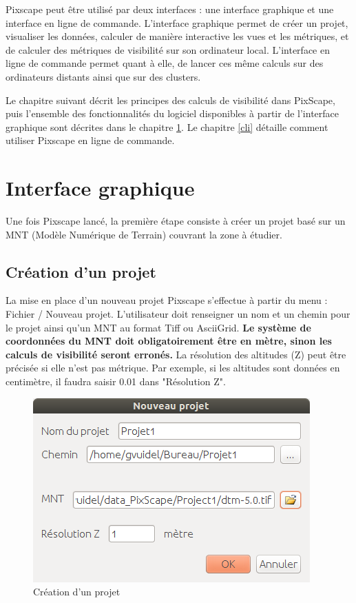 \documentclass{report}
\begin{document}
Pixscape peut être utilisé par deux interfaces : une interface graphique et une interface en ligne de commande.
L'interface graphique permet de créer un projet, visualiser les données, calculer de manière interactive les vues et les métriques, et de calculer des métriques de visibilité sur son ordinateur local. L'interface en ligne de commande permet quant à elle, de lancer ces même calculs sur des ordinateurs distants ainsi que sur des clusters.

Le chapitre suivant décrit les principes des calculs de visibilité dans PixScape, puis l'ensemble des fonctionnalités du logiciel disponibles à partir de l'interface graphique sont décrites dans le chapitre \ref{gui}. Le chapitre \ref{cli} détaille comment utiliser Pixscape en ligne de commande. 



\chapter{Interface graphique}
\label{gui}

Une fois Pixscape lancé, la première étape consiste à créer un projet basé sur un MNT (Modèle Numérique de Terrain) couvrant la zone à étudier.

\section{Création d'un projet}

La mise en place d’un nouveau projet Pixscape s’effectue à partir du menu : Fichier / Nouveau projet. L’utilisateur doit renseigner un nom et un chemin pour le projet ainsi qu'un MNT au format Tiff ou AsciiGrid. \textbf{Le système de coordonnées du MNT doit obligatoirement être en mètre, sinon les calculs de visibilité seront erronés.} La résolution des altitudes (Z) peut être précisée si elle n'est pas métrique. Par exemple, si les altitudes sont données en centimètre, il faudra saisir 0.01 dans "Résolution Z".

\begin{figure}[H]
	\includegraphics[scale=0.5]{img/new_project-fr.png} 
	\caption{Création d'un projet}
\end{figure}
\end{document}
